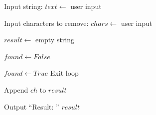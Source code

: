 \begin{algorithm}
\caption{Remove Specified Characters from a String}
\begin{algorithmic}[1]

\STATE Input string:
\STATE $text \gets$ user input

\STATE Input characters to remove:
\STATE $chars \gets$ user input

\STATE $result \gets$ empty string


    \STATE $found \gets False$

            \STATE $found \gets True$
            \STATE Exit loop
        \ENDIF
    \ENDFOR

        \STATE Append $ch$ to $result$
    \ENDIF

\ENDFOR

\STATE Output ``Result: '' $result$

\end{algorithmic}
\end{algorithm}
